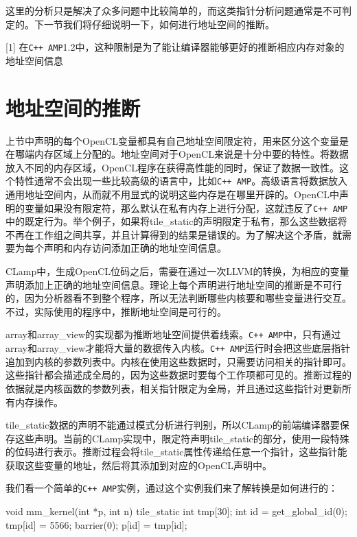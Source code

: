 这里的分析只是解决了众多问题中比较简单的，而这类指针分析问题通常是不可判定的。下一节我们将仔细说明一下，如何进行地址空间的推断。

[1] 在\texttt{C++ AMP}1.2中，这种限制是为了能让编译器能够更好的推断相应内存对象的地址空间信息



\section{地址空间的推断}

上节中声明的每个OpenCL变量都具有自己地址空间限定符，用来区分这个变量是在哪端内存区域上分配的。地址空间对于OpenCL来说是十分中要的特性。将数据放入不同的内存区域，OpenCL程序在获得高性能的同时，保证了数据一致性。这个特性通常不会出现一些比较高级的语言中，比如\texttt{C++ AMP}。高级语言将数据放入通用地址空间内，从而就不用显式的说明这些内存是在哪里开辟的。OpenCL中声明的变量如果没有限定符，那么默认在私有内存上进行分配，这就违反了\texttt{C++ AMP}中的既定行为。举个例子，如果将tile\_\allowbreak{}static的声明限定于私有，那么这些数据将不再在工作组之间共享，并且计算得到的结果是错误的。为了解决这个矛盾，就需要为每个声明和内存访问添加正确的地址空间信息。

CLamp中，生成OpenCL位码之后，需要在通过一次LLVM的转换，为相应的变量声明添加上正确的地址空间信息。理论上每个声明进行地址空间的推断是不可行的，因为分析器看不到整个程序，所以无法判断哪些内核要和哪些变量进行交互。不过，实际使用的程序中，推断地址空间是可行的。

array和array\_\allowbreak{}view的实现都为推断地址空间提供着线索。\texttt{C++ AMP}中，只有通过array和array\_\allowbreak{}view才能将大量的数据传入内核。\texttt{C++ AMP}运行时会把这些底层指针追加到内核的参数列表中。内核在使用这些数据时，只需要访问相关的指针即可。这些指针都会描述成全局的，因为这些数据时要每个工作项都可见的。推断过程的依据就是内核函数的参数列表，相关指针限定为全局，并且通过这些指针对更新所有内存操作。

tile\_\allowbreak{}static数据的声明不能通过模式分析进行判别，所以CLamp的前端编译器要保存这些声明。当前的CLamp实现中，限定符声明tile\_\allowbreak{}static的部分，使用一段特殊的位码进行表示。推断过程会将tile\_\allowbreak{}static属性传递给任意一个指针，这些指针能获取这些变量的地址，然后将其添加到对应的OpenCL声明中。

我们看一个简单的\texttt{C++ AMP}实例，通过这个实例我们来了解转换是如何进行的：

\begin{codebox}[cpp]
void mm_kernel(int *p, int n){
  tile_static int tmp[30];
  int id = get_global_id(0);
  tmp[id] = 5566;
  barrier(0);
  p[id] = tmp[id];
}
\end{codebox}

